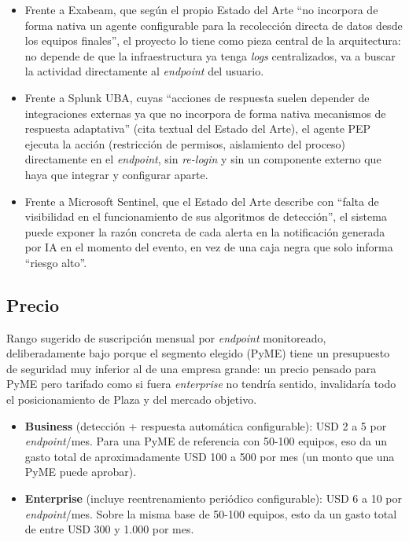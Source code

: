 \begin{itemize}
	\item Frente a Exabeam, que según el propio Estado del Arte ``no incorpora de forma nativa un agente configurable para la recolección directa de datos desde los equipos finales'', el proyecto lo tiene como pieza central de la arquitectura: no depende de que la infraestructura ya tenga \emph{logs} centralizados, va a buscar la actividad directamente al \emph{endpoint} del usuario.
	\item Frente a Splunk UBA, cuyas ``acciones de respuesta suelen depender de integraciones externas ya que no incorpora de forma nativa mecanismos de respuesta adaptativa'' (cita textual del Estado del Arte), el agente PEP ejecuta la acción (restricción de permisos, aislamiento del proceso) directamente en el \emph{endpoint}, sin \emph{re-login} y sin un componente externo que haya que integrar y configurar aparte.
	\item Frente a Microsoft Sentinel, que el Estado del Arte describe con ``falta de visibilidad en el funcionamiento de sus algoritmos de detección'', el sistema puede exponer la razón concreta de cada alerta en la notificación generada por IA en el momento del evento, en vez de una caja negra que solo informa ``riesgo alto''.
\end{itemize}

\subsection{Precio}
Rango sugerido de suscripción mensual por \emph{endpoint} monitoreado, deliberadamente bajo porque el segmento elegido (PyME) tiene un presupuesto de seguridad muy inferior al de una empresa grande: un precio pensado para PyME pero tarifado como si fuera \emph{enterprise} no tendría sentido, invalidaría todo el posicionamiento de Plaza y del mercado objetivo.

\begin{itemize}
	\item \textbf{Business} (detección + respuesta automática configurable): USD 2 a 5 por \emph{endpoint}/mes. Para una PyME de referencia con 50-100 equipos, eso da un gasto total de aproximadamente USD 100 a 500 por mes (un monto que una PyME puede aprobar).
	\item \textbf{Enterprise} (incluye reentrenamiento periódico configurable): USD 6 a 10 por \emph{endpoint}/mes. Sobre la misma base de 50-100 equipos, esto da un gasto total de entre USD 300 y 1.000 por mes.
\end{itemize}

